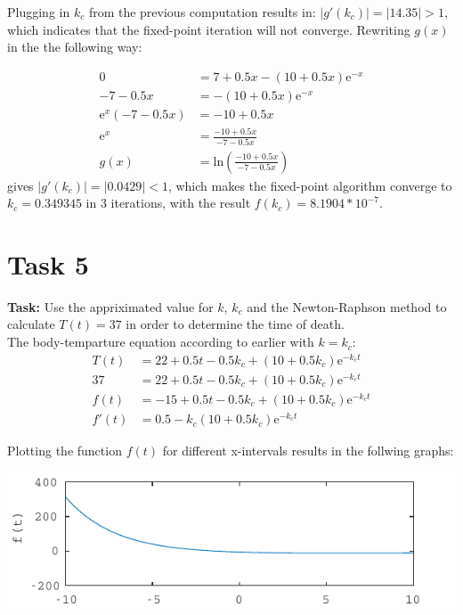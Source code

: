 \documentclass{article}
\begin{document}
  \noindent
  Plugging in $k_c$ from the previous computation results in:  $|g'(k_c)| = |14.35|
  > 1 $, which indicates that the fixed-point iteration will not converge.
  Rewriting $g(x)$ in the the following way:

  \noindent
  \begin{align*}
    0  &= 7 + 0.5x - (10 + 0.5x)\mathrm{e}^{-x} \\
    -7 -0.5x  &= -(10 + 0.5x)\mathrm{e}^{-x} \\
    \mathrm{e}^{x}(-7 -0.5x)  &= -10 + 0.5x \\
    \mathrm{e}^{x}  &= \frac{-10 + 0.5x}{-7-0.5x} \\
    g(x) &= \mathrm{ln}(\frac{-10 + 0.5x}{-7-0.5x})
  \end{align*}
  \noindent
  gives $|g'(k_c)| = |0.0429| < 1 $, which makes the fixed-point algorithm converge to
  $ k_c = 0.349345 $ in 3 iterations, with the result $f(k_c) = 8.1904*10^{-7}$.

\section*{Task 5}

  \textbf{Task:}
  Use the appriximated value for $k$, $k_c$ and the Newton-Raphson method to
  calculate $T(t) = 37$ in order to determine the time of death. \\

  \noindent
  The body-temparture equation according to earlier with $k = k_c$:
  \begin{align*}
    T(t) &= 22 + 0.5t - 0.5k_c + (10 + 0.5k_c)\mathrm{e}^{-k_ct} \\
    37 &= 22 + 0.5t - 0.5k_c + (10 + 0.5k_c)\mathrm{e}^{-k_ct} \\
    f(t) &= -15 + 0.5t - 0.5k_c + (10 + 0.5k_c)\mathrm{e}^{-k_ct} \\
    f'(t) &=  0.5 -k_c(10 + 0.5k_c)\mathrm{e}^{-k_ct}
  \end{align*}

  \noindent
  Plotting the function $f(t)$ for different x-intervals results in the
  follwing graphs:

  \begin{center}
    \includegraphics{figs/t5_check.pdf}
  \end{center}
\end{document}
